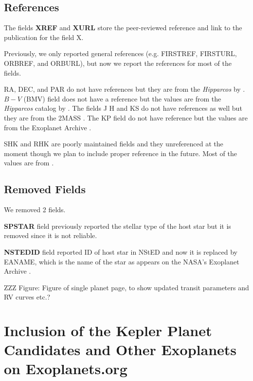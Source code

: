 \documentclass[11pt,preprint]{aastex}
\begin{document}
\begin{CJK*}{UTF8}{gbsn}
\subsection{References}\label{sec:ref}

The fields {\bf XREF} and {\bf XURL} store the peer-reviewed reference
and link to the publication for the field X.

Previously, we only reported general references (e.g. FIRSTREF,
FIRSTURL, ORBREF, and ORBURL), but now we report the references for
most of the fields.

RA, DEC, and PAR do not have references but they are from the
\textit{Hipparcos} by \cite{van Leeuwen2009}. $B-V$ (BMV) field does
not have a reference but the values are from the \textit{Hipparcos}
catalog by \cite{Perryman1997}. The fields J H and KS do not have
references as well but they are from the 2MASS
\citep{Skrutskie2006}. The KP field do not have reference but the
values are from the Exoplanet Archive \citep{Akeson2013}.

SHK and RHK are poorly maintained fields and they unreferenced at the
moment though we plan to include proper reference in the future. Most
of the values are from \cite{Butler2006}.

\subsection{Removed Fields}\label{sec:removed}

We removed 2 fields. 

{\bf SPSTAR} field previously reported the stellar type of the host
star but it is removed since it is not reliable. 

{\bf NSTEDID} field reported ID of host star in NStED and now it is
replaced by EANAME, which is the name of the star as appears on the
NASA's Exoplanet Archive \citep{Akeson2013}. 


ZZZ Figure: Figure of single planet page, to show updated transit
parameters and RV curves etc.?


\section{Inclusion of the Kepler Planet Candidates and Other Exoplanets on Exoplanets.org}\label{sec:kepler}


\end{CJK*}
\end{document}
